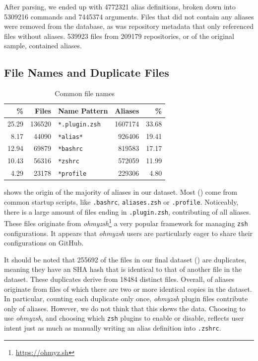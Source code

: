 After parsing, we ended up with \num{4772321} alias definitions, broken down into \num{5309216} commands and \num{7445374} arguments.
Files that did not contain any aliases were removed from the database, as was repository metadata that only referenced files without aliases.
\num{539923} files from \num{209179} repositories, or  of the original sample, contained aliases.

\subsection{File Names and Duplicate Files}

\begin{table}
    \caption{Common file names}
    \label{tab:file-names}
    \begin{tabular}{rrlrr}
        \toprule
                  \% &          Files &        Name Pattern &         Aliases &           \% \\
        \midrule
         \num{25.29} &  \num{136520}  & \verb|*.plugin.zsh| &  \num{1607174}  &  \num{33.68} \\
          \num{8.17} &   \num{44090}  &      \verb|*alias*| &   \num{926406}  &  \num{19.41} \\
         \num{12.94} &   \num{69879}  &      \verb|*bashrc| &   \num{819583}  &  \num{17.17} \\
         \num{10.43} &   \num{56316}  &       \verb|*zshrc| &   \num{572059}  &  \num{11.99} \\
          \num{4.29} &   \num{23178}  &     \verb|*profile| &   \num{229306}  &   \num{4.80} \\
        \bottomrule
    \end{tabular}
\end{table}

 shows the origin of the majority of aliases in our dataset.
Most () come from common startup scripts, like \texttt{.bashrc}, \texttt{aliases.zsh} or \texttt{.profile}.
Noticeably, there is a large amount of files ending in \texttt{.plugin.zsh}, contributing  of all aliases.
These files originate from \emph{ohmyzsh}\footnote{\url{https://ohmyz.sh}} a very popular framework for managing \texttt{zsh} configurations.
It appears that \emph{ohmyzsh} users are particularly eager to share their configurations on GitHub.

It should be noted that \num{255692} of the files in our final dataset () are duplicates, meaning they have an SHA hash that is identical to that of another file in the dataset.
These duplicates derive from \num{18484} distinct files.
Overall,  of aliases originate from files of which there are two or more identical copies in the dataset.
In particular, counting each duplicate only once, \emph{ohmyzsh} plugin files contribute only  of aliases.
However, we do not think that this skews the data.
Choosing to use \emph{ohmyzsh}, and choosing which \texttt{zsh} plugins to enable or disable, reflects user intent just as much as manually writing an alias definition into \texttt{.zshrc}.

